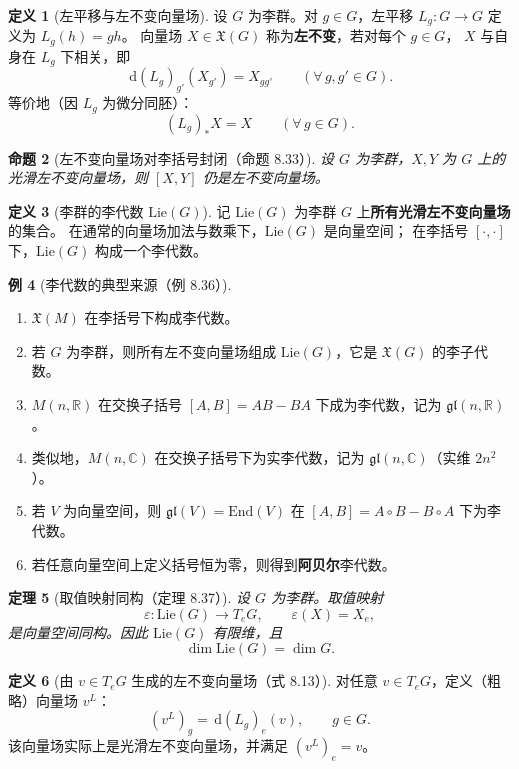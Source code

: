 \documentclass[11pt,a4paper]{article}
\newcommand{\R}{\mathbb{R}}
\newcommand{\C}{\mathbb{C}}
\newcommand{\gl}{\mathfrak{gl}}
\newcommand{\Lie}{\mathrm{Lie}}
\newcommand{\X}{\mathfrak{X}} %
\newcommand{\dd}{\,\mathrm{d}}
\theoremstyle{definition}
\newtheorem{definition}{定义}[section]
\newtheorem{example}[definition]{例}
\theoremstyle{plain}
\newtheorem{theorem}[definition]{定理}
\newtheorem{proposition}[definition]{命题}
\begin{document}
\begin{definition}[左平移与左不变向量场]
设 $G$ 为李群。对 $g\in G$，左平移 $L_g:G\to G$ 定义为 $L_g(h)=gh$。
向量场 $X\in\X(G)$ 称为\textbf{左不变}，若对每个 $g\in G$，
$X$ 与自身在 $L_g$ 下相关，即
\[
\dd(L_g)_{g'}(X_{g'})=X_{gg'}\qquad(\forall\, g,g'\in G).
\]
等价地（因 $L_g$ 为微分同胚）：
\[
(L_g)_*X=X\qquad(\forall\, g\in G). \tag{8.12}
\]
\end{definition}

\begin{proposition}[左不变向量场对李括号封闭（命题 8.33）]
设 $G$ 为李群，$X,Y$ 为 $G$ 上的光滑左不变向量场，则 $[X,Y]$ 仍是左不变向量场。
\end{proposition}

\begin{definition}[李群的李代数 $\Lie(G)$]
记 $\Lie(G)$ 为李群 $G$ 上\textbf{所有光滑左不变向量场}的集合。
在通常的向量场加法与数乘下，$\Lie(G)$ 是向量空间；
在李括号 $[\cdot,\cdot]$ 下，$\Lie(G)$ 构成一个李代数。
\end{definition}

\begin{example}[李代数的典型来源（例 8.36）]
\begin{enumerate}[label=(\alph*)]
\item $\X(M)$ 在李括号下构成李代数。
\item 若 $G$ 为李群，则所有左不变向量场组成 $\Lie(G)$，它是 $\X(G)$ 的李子代数。
\item $M(n,\R)$ 在交换子括号 $[A,B]=AB-BA$ 下成为李代数，记为 $\gl(n,\R)$。
\item 类似地，$M(n,\C)$ 在交换子括号下为实李代数，记为 $\gl(n,\C)$（实维 $2n^2$）。
\item 若 $V$ 为向量空间，则 $\gl(V)=\mathrm{End}(V)$ 在 $[A,B]=A\circ B-B\circ A$ 下为李代数。
\item 若任意向量空间上定义括号恒为零，则得到\textbf{阿贝尔}李代数。
\end{enumerate}
\end{example}

\begin{theorem}[取值映射同构（定理 8.37）]
设 $G$ 为李群。取值映射
\[
\varepsilon:\Lie(G)\to T_eG,\qquad \varepsilon(X)=X_e,
\]
是向量空间同构。因此 $\Lie(G)$ 有限维，且
\[
\dim \Lie(G)=\dim G.
\]
\end{theorem}

\begin{definition}[由 $v\in T_eG$ 生成的左不变向量场（式 8.13）]
对任意 $v\in T_eG$，定义（粗略）向量场 $v^L$：
\[
(v^L)_g=\dd(L_g)_e(v),\qquad g\in G. \tag{8.13}
\]
该向量场实际上是光滑左不变向量场，并满足 $(v^L)_e=v$。
\end{definition}
\end{document}
